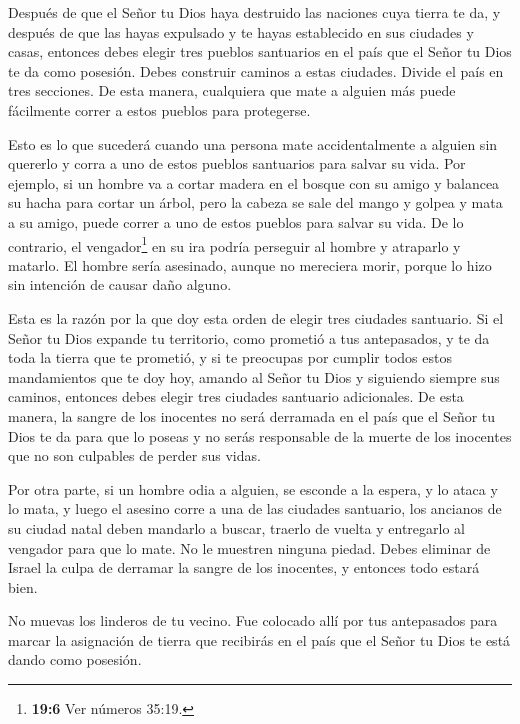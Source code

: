  Después de que el Señor tu Dios haya destruido las naciones
cuya tierra te da, y después de que las hayas expulsado y te hayas
establecido en sus ciudades y casas,  entonces debes elegir
tres pueblos santuarios en el país que el Señor tu Dios te da como
posesión.  Debes construir caminos a estas ciudades. Divide
el país en tres secciones. De esta manera, cualquiera que mate a alguien
más puede fácilmente correr a estos pueblos para protegerse.

 Esto es lo que sucederá cuando una persona mate
accidentalmente a alguien sin quererlo y corra a uno de estos pueblos
santuarios para salvar su vida.  Por ejemplo, si un hombre
va a cortar madera en el bosque con su amigo y balancea su hacha para
cortar un árbol, pero la cabeza se sale del mango y golpea y mata a su
amigo, puede correr a uno de estos pueblos para salvar su vida.
 De lo contrario, el vengador\footnote{\textbf{19:6} Ver
  números 35:19.} en su ira podría perseguir al hombre y atraparlo y
matarlo. El hombre sería asesinado, aunque no mereciera morir, porque lo
hizo sin intención de causar daño alguno.

 Esta es la razón por la que doy esta orden de elegir tres
ciudades santuario.  Si el Señor tu Dios expande tu
territorio, como prometió a tus antepasados, y te da toda la tierra que
te prometió,  y si te preocupas por cumplir todos estos
mandamientos que te doy hoy, amando al Señor tu Dios y siguiendo siempre
sus caminos, entonces debes elegir tres ciudades santuario adicionales.
 De esta manera, la sangre de los inocentes no será
derramada en el país que el Señor tu Dios te da para que lo poseas y no
serás responsable de la muerte de los inocentes que no son culpables de
perder sus vidas.

 Por otra parte, si un hombre odia a alguien, se esconde a
la espera, y lo ataca y lo mata, y luego el asesino corre a una de las
ciudades santuario,  los ancianos de su ciudad natal deben
mandarlo a buscar, traerlo de vuelta y entregarlo al vengador para que
lo mate.  No le muestren ninguna piedad. Debes eliminar de
Israel la culpa de derramar la sangre de los inocentes, y entonces todo
estará bien.

 No muevas los linderos de tu vecino. Fue colocado allí por
tus antepasados para marcar la asignación de tierra que recibirás en el
país que el Señor tu Dios te está dando como posesión.


